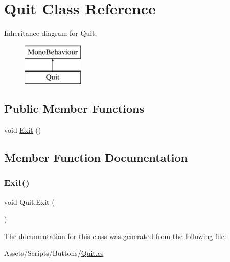 \hypertarget{class_quit}{}\section{Quit Class Reference}
\label{class_quit}
Inheritance diagram for Quit\+:\begin{figure}[H]
\begin{center}
\leavevmode
\includegraphics[height=2.000000cm]{class_quit}
\end{center}
\end{figure}
\subsection*{Public Member Functions}
\begin{DoxyCompactItemize}
\item 
void \mbox{\hyperlink{class_quit_ab9e748ddc8aeb84ce108116c22ac5804}{Exit}} ()
\end{DoxyCompactItemize}


\subsection{Member Function Documentation}
\mbox{\label{class_quit_ab9e748ddc8aeb84ce108116c22ac5804}} 
\subsubsection{\texorpdfstring{Exit()}{Exit()}}
{\footnotesize\ttfamily void Quit.\+Exit (\begin{DoxyParamCaption}{ }\end{DoxyParamCaption})\hspace{0.3cm}{\ttfamily [inline]}}



The documentation for this class was generated from the following file\+:\begin{DoxyCompactItemize}
\item 
Assets/\+Scripts/\+Buttons/\mbox{\hyperlink{_quit_8cs}{Quit.\+cs}}\end{DoxyCompactItemize}
